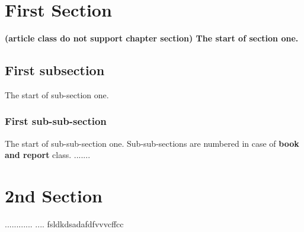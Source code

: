 \documentclass{article}
\begin{document}
	\section{First Section}
	\bfseries\huge (article class do not support  chapter section) \normalfont\normalsize The start of section one.
	\subsection{First subsection}
	The start of sub-section one.
	\subsubsection{First sub-sub-section}
	The start of sub-sub-section one. Sub-sub-sections are numbered in case of {\bf\Huge book and report} class.
	\newpage
	.......
    \newpage
    \section{2nd Section}
    ............
    \newpage
    ....
	fsldkdsadafdfvvvcffcc
\end{document}
